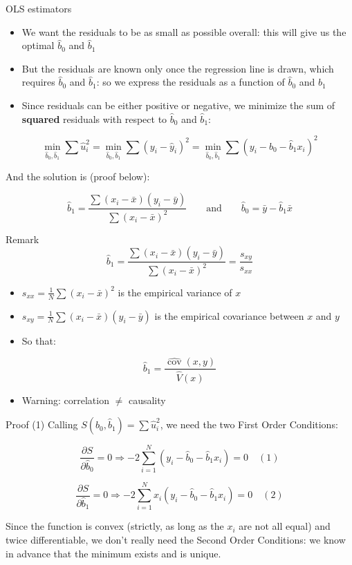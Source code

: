 \documentclass[aspectratio=169]{beamer}
\begin{document}
\begin{frame}{OLS estimators}
\begin{itemize}
    \item We want the residuals to be as small as possible overall: this will give us the optimal $\hat{b}_0$ and $\hat{b}_1$
    \item But the residuals are known only once the regression line is drawn, which requires $\hat{b}_0$ and $\hat{b}_1$: so we express the residuals as a function of $\hat{b}_0$ and $\hat{b}_1$
    \item Since residuals can be either positive or negative, we minimize the sum of \textbf{squared} residuals with respect to $\hat{b}_0$ and $\hat{b}_1$:
\end{itemize}

\[\min_{\hat{b}_0, \hat{b}_1} \sum \hat{u}_i^2 = \min_{\hat{b}_0, \hat{b}_1} \sum(y_i - \hat{y}_i)^2 = \min_{\hat{b}_0, \hat{b}_1} \sum(y_i - \hat{b}_0 - \hat{b}_1x_i)^2\]

And the solution is (proof below):

\[\hat{b}_1 = \frac{\sum(x_i - \bar{x})(y_i - \bar{y})}{\sum(x_i - \bar{x})^2} \qquad \text{and} \qquad \hat{b}_0 = \bar{y} - \hat{b}_1\bar{x}\]
\end{frame}

\begin{frame}{Remark}
\[\hat{b}_1 = \frac{\sum(x_i - \bar{x})(y_i - \bar{y})}{\sum(x_i - \bar{x})^2} = \frac{s_{xy}}{s_{xx}}\]

\begin{itemize}
    \item $s_{xx} = \frac{1}{N}\sum(x_i - \bar{x})^2$ is the empirical variance of $x$
    \item $s_{xy} = \frac{1}{N}\sum(x_i - \bar{x})(y_i - \bar{y})$ is the empirical covariance between $x$ and $y$
    \item So that:
\end{itemize}

\[\hat{b}_1 = \frac{\widehat{\operatorname{cov}}(x,y)}{\hat{V}(x)}\]

\begin{itemize}
    \item Warning: correlation $\neq$ causality
\end{itemize}
\end{frame}

\begin{frame}{Proof (1)}
Calling $S(\hat{b}_0, \hat{b}_1) = \sum \hat{u}_i^2$, we need the two First Order Conditions:

\[\frac{\partial S}{\partial \hat{b}_0} = 0 \Rightarrow -2\sum_{i=1}^{N}(y_i - \hat{b}_0 - \hat{b}_1x_i) = 0 \quad (1)\]

\[\frac{\partial S}{\partial \hat{b}_1} = 0 \Rightarrow -2\sum_{i=1}^{N}x_i(y_i - \hat{b}_0 - \hat{b}_1x_i) = 0 \quad (2)\]

Since the function is convex (strictly, as long as the $x_i$ are not all equal) and twice differentiable, we don't really need the Second Order Conditions: we know in advance that the minimum exists and is unique.
\end{frame}
\end{document}
